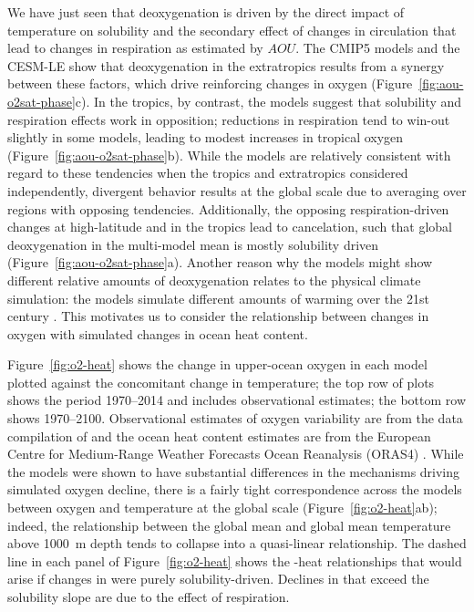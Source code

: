 \documentclass{report_chapter}
\begin{document}
We have just seen that deoxygenation is driven by the direct impact of temperature on solubility and the secondary effect of changes in circulation that lead to changes in respiration as estimated by $AOU$.
The CMIP5 models and the CESM-LE show that deoxygenation in the extratropics results from a synergy between these factors, which drive reinforcing changes in oxygen (Figure~\ref{fig:aou-o2sat-phase}c).
In the tropics, by contrast, the models suggest that solubility and respiration effects work in opposition; reductions in respiration tend to win-out slightly in some models, leading to modest increases in tropical oxygen (Figure~\ref{fig:aou-o2sat-phase}b).
While the models are relatively consistent with regard to these tendencies when the tropics and extratropics considered independently, divergent behavior results at the global scale due to averaging over regions with opposing tendencies.
Additionally, the opposing respiration-driven changes at high-latitude and in the tropics lead to cancelation, such that global deoxygenation in the multi-model mean is mostly solubility driven (Figure~\ref{fig:aou-o2sat-phase}a).
Another reason why the models might show different relative amounts of deoxygenation relates to the physical climate simulation: the models simulate different amounts of warming over the 21st century \citep{Bopp-Resplandy-etal-2013}.
This motivates us to consider the relationship between changes in oxygen with simulated changes in ocean heat content.

Figure~\ref{fig:o2-heat} shows the change in upper-ocean oxygen in each model plotted against the concomitant change in temperature; the top row of plots shows the period 1970--2014 and includes observational estimates; the bottom row shows 1970--2100.
Observational estimates of oxygen variability are from the data compilation of \citet{Ito-Minobe-etal-2017} and the ocean heat content estimates are from the European Centre for Medium-Range Weather Forecasts Ocean Reanalysis (ORAS4) \citep{Balmaseda-Trenberth-etal-2013}.
While the models were shown to have substantial differences in the mechanisms driving simulated oxygen decline, there is a fairly tight correspondence across the models between oxygen and temperature at the global scale (Figure~\ref{fig:o2-heat}ab); indeed, the relationship between the global mean \OO{} and global mean temperature above 1000~m depth tends to collapse into a quasi-linear relationship.
The dashed line in each panel of Figure~\ref{fig:o2-heat} shows the \OO{}-heat relationships that would arise if changes in \OO{} were purely solubility-driven.
Declines in \OO{} that exceed the solubility slope are due to the effect of respiration.
\end{document}
